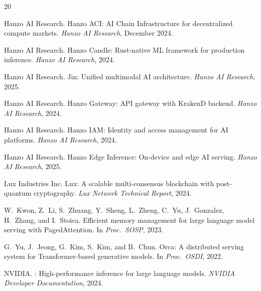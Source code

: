 \begin{thebibliography}{20}

{Hanzo AI Research}.
\newblock Hanzo {ACI}: {AI} Chain Infrastructure for decentralized compute markets.
\newblock \emph{Hanzo AI Research}, December 2024.

{Hanzo AI Research}.
\newblock Hanzo Candle: Rust-native {ML} framework for production inference.
\newblock \emph{Hanzo AI Research}, 2024.

{Hanzo AI Research}.
\newblock Jin: Unified multimodal {AI} architecture.
\newblock \emph{Hanzo AI Research}, 2025.

{Hanzo AI Research}.
\newblock Hanzo Gateway: {API} gateway with {KrakenD} backend.
\newblock \emph{Hanzo AI Research}, 2024.

{Hanzo AI Research}.
\newblock Hanzo {IAM}: Identity and access management for {AI} platforms.
\newblock \emph{Hanzo AI Research}, 2024.

{Hanzo AI Research}.
\newblock Hanzo Edge Inference: On-device and edge {AI} serving.
\newblock \emph{Hanzo AI Research}, 2025.

{Lux Industries Inc}.
\newblock Lux: A scalable multi-consensus blockchain with post-quantum cryptography.
\newblock \emph{Lux Network Technical Report}, 2024.

W.~Kwon, Z.~Li, S.~Zhuang, Y.~Sheng, L.~Zheng, C.~Yu, J.~Gonzalez, H.~Zhang, and I.~Stoica.
\newblock Efficient memory management for large language model serving with {PagedAttention}.
\newblock In \emph{Proc.\ SOSP}, 2023.

G.~Yu, J.~Jeong, G.~Kim, S.~Kim, and B.~Chun.
\newblock Orca: A distributed serving system for {Transformer}-based generative models.
\newblock In \emph{Proc.\ OSDI}, 2022.

{NVIDIA}.
: High-performance inference for large language models.
\newblock \emph{NVIDIA Developer Documentation}, 2024.

\end{thebibliography}

